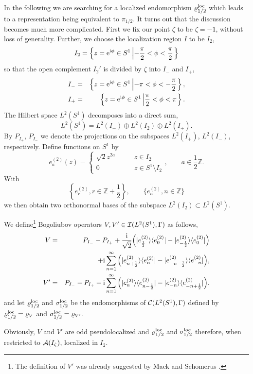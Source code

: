 \documentclass[10pt,a4paper]{article}
\begin{document}
In the following we are searching for a localized
endomorphism $\varrho_{1/2}^{\rm loc}$ which leads
to a representation being equivalent to $\pi_{1/2}$.
It turns out that the discussion becomes much more
complicated. First we fix our point $\zeta$ to be
$\zeta=-1$, without loss of generality. Further, we
choose the localization region $I$ to be $I_2$,
\[ I_2 = \left\{ z={\rm e}^{{\rm i}\phi} \in S^1 \left|
-\frac{\pi}{2} <
\phi < \frac{\pi}{2} \right. \right\} \]
so that the open complement $I_2'$ is divided by
$\zeta$ into $I_-$ and $I_+$,
\begin{eqnarray*}
I_- &=& \left\{ z={\rm e}^{{\rm i}\phi} \in S^1 \left| -\pi <
\phi < -\frac{\pi}{2} \right. \right\}, \\
I_+ &=& \left\{ z={\rm e}^{{\rm i}\phi} \in S^1 \left|
\frac{\pi}{2} < \phi < \pi \right. \right\}.
\end{eqnarray*}
The Hilbert space $L^2(S^1)$ decomposes into a direct sum,
\[ L^2(S^1) = L^2(I_-) \oplus L^2(I_2) \oplus L^2(I_+).\]
By $P_{I_+}$, $P_{I_-}$ we denote the projections on the
subspaces $L^2(I_+)$, $L^2(I_-)$, respectively.
Define functions on $S^1$ by
\[ e_a^{(2)}(z)= \left\{ \begin{array}{cl}
\sqrt{2}z^{2a} & \qquad z\in I_2 \\
0 & \qquad z\in S^1\setminus I_2 \end{array} \right.,
\qquad a\in \frac{1}{2}\mathbb{Z}. \]
With
\[ \left\{e_r^{(2)}, r\in \mathbb{Z}+\frac{1}{2}
\right\},\qquad
\{ e_n^{(2)}, n\in\mathbb{Z} \} \]
we then obtain two orthonormal bases of the subspace
$L^2(I_2)\subset L^2(S^1)$.
\begin{definition}
\label{def1/2loc}
We define\footnote{The definition of $V'$ was already
suggested by Mack and Schomerus \cite{MS1}.}
Bogoliubov operators $V,V'\in {\cal I}(L^2(S^1),\Gamma)$
as follows,
\begin{eqnarray}
V &=& P_{I_-}-P_{I_+}+ \frac{{\rm i}}{\sqrt{2}} \Big(
|e_\frac{1}{2}^{(2)}\rangle\langle e_0^{(2)}|-
|e_{-\frac{1}{2}}^{(2)}\rangle\langle e_0^{(2)}|
\Big) \\
&& \qquad + {\rm i} \sum_{n=1}^\infty\Big(
|e_{n+\frac{1}{2}}^{(2)}\rangle
\langle e_n^{(2)} | - |e_{-n-\frac{1}{2}}^{(2)}
\rangle\langle e_{-n}^{(2)}|\Big),\nonumber \\
V' &=& P_{I_-}-P_{I_+}+ {\rm i} \sum_{n=1}^\infty\Big(
|e_n^{(2)}\rangle\langle e_{n-\frac{1}{2}}^{(2)} |
-|e_{-n}^{(2)}\rangle\langle
e_{-n+\frac{1}{2}}^{(2)}|\Big).
\end{eqnarray}
and let $\varrho_{1/2}^{\rm loc}$ and
$\sigma_{1/2}^{\rm loc}$ be the endomorphisms of
${\cal C}(L^2(S^1),\Gamma)$ defined by
$\varrho_{1/2}^{\rm loc}=\varrho_V$ and
$\sigma_{1/2}^{\rm loc}=\varrho_{V'}$.
\end{definition}
Obviously, $V$ and $V'$ are odd pseudolocalized and
$\varrho_{1/2}^{\rm loc}$ and $\sigma_{1/2}^{\rm loc}$
therefore, when restricted to ${\cal A}(I_\zeta)$,
localized in $I_2$.
\end{document}
